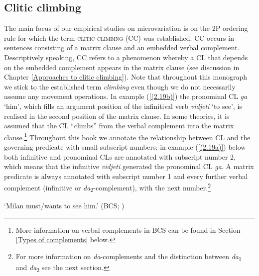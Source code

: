 \subsection{Clitic climbing}
\label{Clitic climbing}
The main focus of our empirical studies on microvariation is on the 2P ordering rule for which the term \textsc{clitic climbing} (CC) was established. CC occurs in sentences consisting of a matrix clause and an embedded verbal complement. Descriptively speaking, CC refers to a phenomenon whereby a CL that depends on the embedded complement appears in the matrix clause (see discussion in Chapter \ref{Approaches to clitic climbing}). Note that throughout this monograph we stick to the established term \textit{climbing} even though we do not necessarily assume any movement operations. In example (\ref{(2.19b)}) the pronominal CL \textit{ga} `him', which fills an argument position of the infinitival verb \textit{vidjeti} `to see', is realised in the second position of the matrix clause. In some theories, it is assumed that the CL ``climbs'' from the verbal complement into the matrix clause.\footnote{More information on verbal complements in BCS can be found in Section \ref{Types of complements} below.} Throughout this book we annotate the relationship between CL and the governing predicate with small subscript numbers: in example (\ref{(2.19a)}) below both infinitive and pronominal CLs are annotated with subscript number 2, which means that the infinitive \textit{vidjeti} generated the pronominal CL \textit{ga}. A matrix predicate is always annotated with subscript number 1 and every further verbal complement (infinitive or \textit{da}\textsubscript{2}-complement), with the next number.\footnote{For more information on \textit{da}-complements and the distinction between \textit{da}\textsubscript{1} and \textit{da}\textsubscript{2} see the next section.}

\begin{exe}\ex
\begin{xlist}
\end{xlist}
\glt ‘Milan must/wants to see him.’
\hfill (BCS; \citealt[179f]{Stjepanovic04})
\end{exe}

